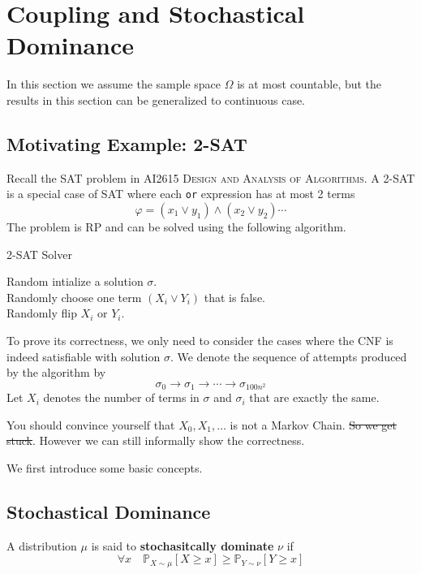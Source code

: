\section{Coupling and Stochastical Dominance}
In this section we assume the sample space $\Omega$ is at most countable, but the results in this section can be generalized to continuous case.

    \subsection{Motivating Example: 2-SAT}
        Recall the SAT problem in \textsc{AI2615 Design and Analysis of Algorithms}. A 2-SAT is a special case of SAT where each \verb|or| expression has at most 2 terms
        \[ \varphi = (x_1 \vee y_1) \wedge (x_2 \vee y_2) \cdots \]
        The problem is RP and can be solved using the following algorithm.

        \begin{algorithm}
            \caption{2-SAT Solver}
            Random intialize a solution $\sigma$.\\
            {
                {
                    \KwRet{$\sigma$}
                }
                \Else
                {
                    Randomly choose one term $(X_i \vee Y_i)$ that is false.\\
                    Randomly flip $X_i$ or $Y_i$.
                }
            }
            \label{2SATAlgo}
        \end{algorithm}

        To prove its correctness, we only need to consider the cases where the CNF is indeed satisfiable with solution $\sigma$. We denote the sequence of attempts produced by the algorithm by
        \[ \sigma_0 \to \sigma_1 \to \cdots \to \sigma_{100n^2} \]
        Let $X_i$ denotes the number of terms in $\sigma$ and $\sigma_i$ that are exactly the same.

        You should convince yourself that $X_0, X_1, \dots$ is not a Markov Chain. \sout{So we get stuck}. However we can still informally show the correctness.

        We first introduce some basic concepts.

    \subsection{Stochastical Dominance}
        \begin{definition}
            A distribution $\mu$ is said to \textbf{stochasitcally dominate} $\nu$ if
            \[ \forall x\quad \mathbb{P}_{X\sim\mu}[X \ge x] \ge \mathbb{P}_{Y\sim\nu}[Y \ge x] \]
        \end{definition}
